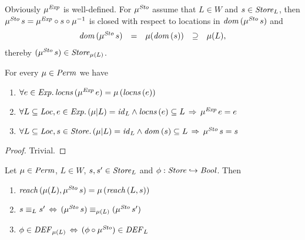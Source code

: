 \documentclass[12pt,a4paper]{report}
\newcommand{\Sto}{\nstyle{Sto}}
\newcommand{\DEF}{\nstyle{DEF}}
\newcommand{\id}{\nstyle{id}}
\begin{document}
Obviously $\mu^{\mathit{Exp}}$ is well-defined. For $\mu^\Sto$ assume that $L \in W$ and $s\in\mathit{Store}_L$,
then $\mu^\Sto\,s = \mu^\Exp \circ s \circ \mu^{-1}$ is closed with respect to locations in
$\dom{\mu^\Sto\,s}$ and
\[\begin{array}{rccccl}
  \dom{\mu^\Sto\,s} &=& \mu(\dom{s}) &\supseteq& \mu(L),
\end{array}\]
thereby $(\mu^\Sto\,s) \in \Store_{\mu(L)}$.

\begin{lemma}[Permutations] \label{lemma:Permutations}
  For every $\mu\in\mathit{Perm}$ we have
  \begin{enumerate}
    \item $\forall e\in\mathit{Exp}.\,\mathit{locns}\,(\mu^{\mathit{Exp}}\,e) = \mu\,(\mathit{locns}\,(e))$
    \item $\forall L \subseteq \Loc, e\in\Exp.\,(\mu|L)=\id_L\wedge\locns{e} \subseteq L \,\Rightarrow\, \mu^\Exp\,e = e$
    \item $\forall L \subseteq \Loc, s\in\Store.\,(\mu|L)=\id_L\wedge\dom{s} \subseteq L \,\Rightarrow\, \mu^\Sto\,s = s$
  \end{enumerate}
\end{lemma}

\begin{proof}
  Trivial.
\end{proof}

\begin{lemma} \label{lemma:Permutations_and_Reachability}
  Let $\mu \in \mathit{Perm}$, $L \in W$, $s,s'\in\mathit{Store}_L$ and $\phi:\mathit{Store}\hookrightarrow\mathit{Bool}$.
  Then
  \begin{enumerate}
    \item $\reach{\mu(L)}{\mu^\Sto\,s} = \mu\,(\reach{L}{s})$
    \item $s \equiv_L s' \,\Leftrightarrow\, (\mu^\Sto\,s) \equiv_{\mu(L)} (\mu^\Sto\,s')$
    \item $\phi \in \DEF_{\mu(L)} \,\Leftrightarrow\, (\phi \circ \mu^\Sto) \in \DEF_L$
  \end{enumerate}
\end{lemma}
\end{document}
